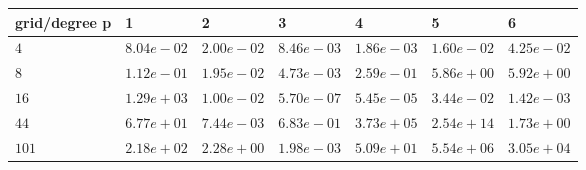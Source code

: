 \begin{tabular}{lllllll}
\hline
 grid/degree p   & 1          & 2          & 3          & 4          & 5          & 6          \\
\hline
 $4$             & $8.04e-02$ & $2.00e-02$ & $8.46e-03$ & $1.86e-03$ & $1.60e-02$ & $4.25e-02$ \\
 $8$             & $1.12e-01$ & $1.95e-02$ & $4.73e-03$ & $2.59e-01$ & $5.86e+00$ & $5.92e+00$ \\
 $16$            & $1.29e+03$ & $1.00e-02$ & $5.70e-07$ & $5.45e-05$ & $3.44e-02$ & $1.42e-03$ \\
 $44$            & $6.77e+01$ & $7.44e-03$ & $6.83e-01$ & $3.73e+05$ & $2.54e+14$ & $1.73e+00$ \\
 $101$           & $2.18e+02$ & $2.28e+00$ & $1.98e-03$ & $5.09e+01$ & $5.54e+06$ & $3.05e+04$ \\
\hline
\end{tabular}